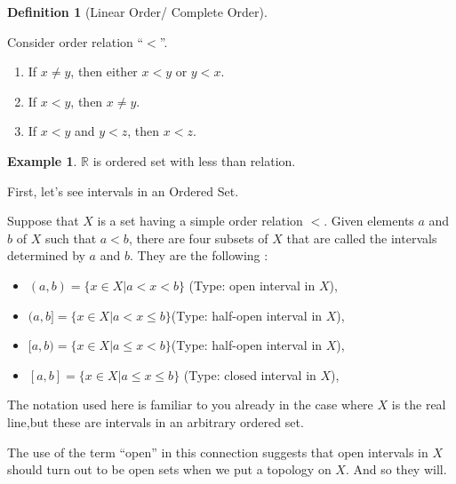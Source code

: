 \documentclass[
]{book}
\providecommand{\tightlist}{%
  \setlength{\itemsep}{0pt}\setlength{\parskip}{0pt}}
\theoremstyle{definition}
\newtheorem{definition}{Definition}[chapter]
\theoremstyle{definition}
\newtheorem{example}{Example}[chapter]
\theoremstyle{definition}
\theoremstyle{definition}
\theoremstyle{remark}
\begin{document}
\begin{definition}[Linear Order/ Complete Order]
\protect\hypertarget{def:unnamed-chunk-25}{}\label{def:unnamed-chunk-25}

Consider order relation ``\(<\)''.

\begin{enumerate}
\def\labelenumi{\arabic{enumi}.}
\tightlist
\item
  If \(x \neq y\), then either \(x < y\) or \(y < x\).
\item
  If \(x < y\), then \(x\neq y\).
\item
  If \(x < y\) and \(y < z\), then \(x < z\).
\end{enumerate}

\end{definition}

\begin{example}
\protect\hypertarget{exm:unnamed-chunk-26}{}\label{exm:unnamed-chunk-26}\(\mathbb{R}\) is ordered set with less than relation.
\end{example}

First, let's see intervals in an Ordered Set.

Suppose that \(X\) is a set having a simple order relation \(<\). Given elements \(a\) and \(b\)
of \(X\) such that \(a < b\), there are four subsets of \(X\) that are called the intervals determined by \(a\) and \(b\). They are the following :

\begin{itemize}
\tightlist
\item
  \((a, b) = \{x\in X | a < x < b\}\) (Type: open interval in \(X\)),
\item
  \((a, b] = \{x\in X | a < x ≤ b\}\)(Type: half-open interval in \(X\)),
\item
  \([a, b) = \{x\in X | a ≤ x < b\}\)(Type: half-open interval in \(X\)),
\item
  \([a, b] = \{x\in X | a ≤ x ≤ b\}\) (Type: closed interval in \(X\)),
\end{itemize}

The notation used here is familiar to you already in the case where \(X\) is the real line,but these are intervals in an arbitrary ordered set.

The use of the term ``open'' in this connection suggests that open intervals in \(X\) should turn out to be open sets when
we put a topology on \(X\). And so they will.
\end{document}
